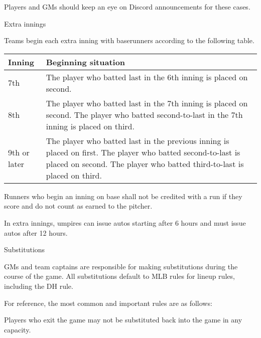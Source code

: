 \begin{deepEnumerate}
\begin{deepEnumerate}
\begin{deepEnumerate}
			Players and GMs should keep an eye on Discord announcements for these cases.
		\end{deepEnumerate}
	\end{deepEnumerate}
	\item Extra innings
	\label{sec:extra innings}
	\begin{deepEnumerate}
		\item Teams begin each extra inning with baserunners according to the following table.
		\begin{center}										                
			\begin{longtable}{|p{3cm}|p{8cm}|}
				\hline
				\textbf{Inning} & \textbf{Beginning situation}                                          \\
				\hline
				7th             & The player who batted last in the 6th inning is placed on second.     \\
				\hline
				8th             & The player who batted last in the 7th inning is placed on second.     
				The player who batted second-to-last in the 7th inning is placed on third. \\
				\hline
				9th or later    & The player who batted last in the previous inning is placed on first. 
				The player who batted second-to-last is placed on second.
				The player who batted third-to-last is placed on third. \\
				\hline
			\end{longtable}
		\end{center}
		\item Runners who begin an inning on base shall not be credited with a run if they score and
		do not count as earned to the pitcher.
		\item In extra innings, umpires can issue autos starting after 6 hours and must issue autos after 12 hours.
	\end{deepEnumerate}
	\item Substitutions
	\label{sec:substitutions}
	\begin{deepEnumerate}
		\item GMs and team captains are responsible for making substitutions during the course of the game.
		All substitutions default to MLB rules for lineup rules, including the DH rule.
		\begin{deepEnumerate}
			\item For reference, the most common and important rules are as follows:
			\begin{deepEnumerate}
				\item Players who exit the game may not be substituted back into the game in any capacity.

\end{deepEnumerate}
\end{deepEnumerate}
\end{deepEnumerate}
\end{deepEnumerate}

